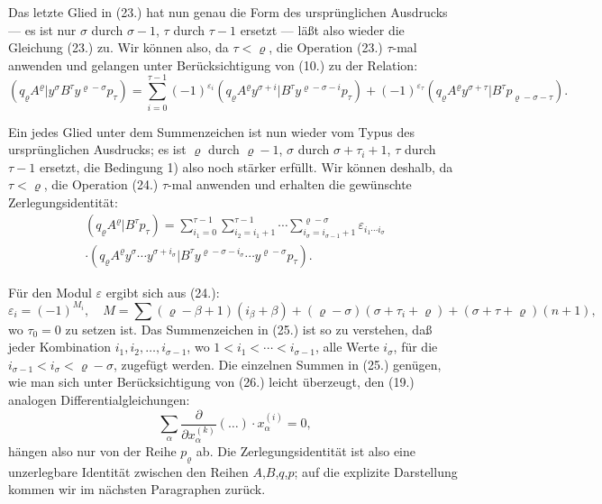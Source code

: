 \documentclass[12pt,a4paper]{article}
\begin{document}
Das letzte Glied in (23.) hat nun genau die Form des ursprünglichen Ausdrucks --- es ist nur $\sigma$ durch $\sigma-1$, $\tau$ durch $\tau-1$ ersetzt --- läßt also wieder die Gleichung (23.) zu. Wir können also, da $\tau < \varrho$, die Operation (23.) $\tau$-mal anwenden und gelangen unter Berücksichtigung von (10.) zu der Relation:
\begin{equation}\tag{24}
(q_{\varrho} A^{\varrho} | y^{\sigma} B^{\tau} y^{\varrho-\sigma} p_{\tau}) = \sum_{i=0}^{\tau-1} (-1)^{\varepsilon_{i}} (q_{\varrho} A^{\varrho} y^{\sigma+i} | B^{\tau} y^{\varrho-\sigma-i} p_{\tau}) + (-1)^{\varepsilon_{\tau}} (q_{\varrho} A^{\varrho} y^{\sigma+\tau} | B^{\tau} p_{\varrho-\sigma-\tau}).
\end{equation}

Ein jedes Glied unter dem Summenzeichen ist nun wieder vom Typus des ursprünglichen Ausdrucks; es ist $\varrho$ durch $\varrho-1$, $\sigma$ durch $\sigma+\tau_{i}+1$, $\tau$ durch $\tau-1$ ersetzt, die Bedingung 1) also noch stärker erfüllt. Wir können deshalb, da $\tau < \varrho$, die Operation (24.) $\tau$-mal anwenden und erhalten die gewünschte Zerlegungsidentität:
\begin{multline}\tag{25}
(q_{\varrho} A^{\varrho} | B^{\tau} p_{\tau}) = \sum_{i_{1}=0}^{\tau-1} \sum_{i_{2}=i_{1}+1}^{\tau-1} \cdots \sum_{i_{\sigma}=i_{\sigma-1}+1}^{\varrho-\sigma} \varepsilon_{i_{1} \cdots i_{\sigma}} \\ \cdot (q_{\varrho} A^{\varrho} y^{\sigma} \cdots y^{\sigma+i_{\sigma}} | B^{\tau} y^{\varrho-\sigma-i_{\sigma}} \cdots y^{\varrho-\sigma} p_{\tau}).
\end{multline}

Für den Modul $\varepsilon$ ergibt sich aus (24.):
\begin{equation}\tag{26}
\varepsilon_{i} = (-1)^{M_{i}}, \quad M = \sum (\varrho - \beta + 1)(i_{\beta} + \beta) + (\varrho - \sigma)(\sigma + \tau_{i} + \varrho) + (\sigma + \tau + \varrho)(n+1),
\end{equation}
wo $\tau_{0} = 0$ zu setzen ist. Das Summenzeichen in (25.) ist so zu verstehen, daß jeder Kombination $i_{1}, i_{2}, \ldots, i_{\sigma-1}$, wo $1 < i_{1} < \cdots < i_{\sigma-1}$, alle Werte $i_{\sigma}$, für die $i_{\sigma-1} < i_{\sigma} < \varrho - \sigma$, zugefügt werden. Die einzelnen Summen in (25.) genügen, wie man sich unter Berücksichtigung von (26.) leicht überzeugt, den (19.) analogen Differentialgleichungen:
\begin{equation*}
\sum_{\alpha} \frac{\partial}{\partial x^{(k)}_{\alpha}} (\ldots) \cdot x^{(i)}_{\alpha} = 0,
\end{equation*}
hängen also nur von der Reihe $p_{\varrho}$ ab. Die Zerlegungsidentität ist also eine unzerlegbare Identität zwischen den Reihen $A$,$B$,$q$,$p$; auf die explizite Darstellung kommen wir im nächsten Paragraphen zurück.
\end{document}
